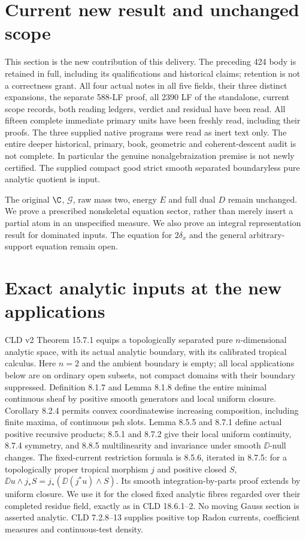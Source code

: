 \section{Current new result and unchanged scope}
This section is the new contribution of this delivery. The preceding
424 body is retained in full, including its qualifications and historical
claims; retention is not a correctness grant. All four actual notes in
all five fields, their three distinct expansions, the separate 588-LF
proof, all 2390 LF of the standalone, current scope records, both reading
ledgers, verdict and residual have been read. All fifteen complete
immediate primary units have been freshly read, including their proofs.
The three supplied native programs were read as inert text only.
The entire deeper historical, primary, book, geometric and coherent-descent
audit is not complete. In particular the genuine nonalgebraization premise
is not newly certified. The supplied compact good strict smooth separated
boundaryless pure analytic quotient is input.

The original $\C$, $\mathcal G$, raw mass two, energy $E$ and full
dual $D$ remain unchanged. We prove a prescribed nonskeletal equation
sector, rather than merely insert a partial atom in an unspecified measure.
We also prove an integral representation result for dominated inputs.
The equation for $2\delta_x$ and the general arbitrary-support equation
remain open.

\section{Exact analytic inputs at the new applications}
CLD v2 Theorem 15.7.1 equips a topologically separated pure $n$-dimensional
analytic space, with its actual analytic boundary, with its calibrated
tropical calculus. Here $n=2$ and the ambient boundary is empty; all local
applications below are on ordinary open subsets, not compact domains with
their boundary suppressed. Definition 8.1.7 and Lemma 8.1.8 define the
entire minimal continuous sheaf by positive smooth generators and local
uniform closure. Corollary 8.2.4 permits convex coordinatewise increasing
composition, including finite maxima, of continuous psh slots.
Lemma 8.5.5 and 8.7.1 define actual positive recursive products;
8.5.1 and 8.7.2 give their local uniform continuity, 8.7.4 symmetry,
and 8.8.5 multilinearity and invariance under smooth $\DD$-null changes.
The fixed-current restriction formula is 8.5.6, iterated in 8.7.5:
for a topologically proper tropical morphism $j$ and positive closed $S$,
$\DD u\wedge j_*S=j_*(\DD(j^*u)\wedge S)$.
Its smooth integration-by-parts proof extends by uniform closure.
We use it for the closed fixed analytic fibres regarded over their
completed residue field, exactly as in CLD 18.6.1--2. No moving Gauss
section is asserted analytic. CLD 7.2.8--13 supplies positive top Radon
currents, coefficient measures and continuous-test density.

